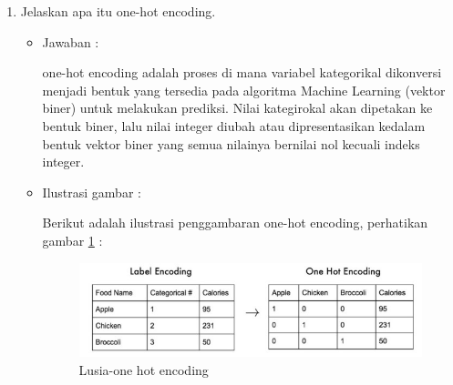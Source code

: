 \begin{enumerate}
\item Jelaskan apa itu one-hot encoding.
	\begin{itemize}
	\item Jawaban :
		\par one-hot encoding adalah proses di mana variabel kategorikal dikonversi menjadi bentuk yang tersedia pada algoritma Machine Learning (vektor biner) untuk melakukan prediksi. Nilai kategirokal akan dipetakan ke bentuk biner, lalu nilai integer diubah atau dipresentasikan kedalam bentuk vektor biner yang semua nilainya bernilai nol kecuali indeks integer.
	\item Ilustrasi gambar :
		\par Berikut adalah ilustrasi penggambaran one-hot encoding, perhatikan gambar \ref{6A6} :
		\begin{figure}[!hbtp]
		\centering
		\includegraphics[scale=0.4]{figures/s6.jpg}
		\caption{Lusia-one hot encoding}
		\label{6A6}
		\end{figure}
	\end{itemize}
	

\end{enumerate}
